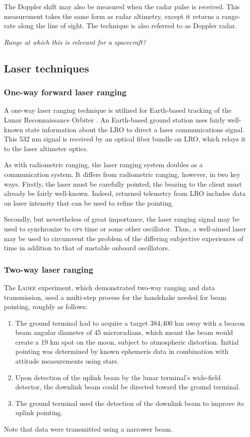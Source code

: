 \documentclass[12pt]{article}
\begin{document}
The Doppler shift may also be measured when the radar pulse is received. This measurement takes the same form as radar altimetry, except it returns a range-rate along the line of sight. The technique is also referred to as Doppler radar.

\textit{Range at which this is relevant for a spacecraft?}

\subsection{Laser techniques}

\subsubsection{One-way forward laser ranging}
A one-way laser ranging technique is utilized for Earth-based tracking of the Lunar Reconnaissance Orbiter \citep{Sun2013}. An Earth-based ground station uses fairly well-known state information about the LRO to direct a laser communications signal. This 532 nm signal is received by an optical fiber bundle on LRO, which relays it to the laser altimeter optics.

As with radiometric ranging, the laser ranging system doubles as a communication system. It differs from radiometric ranging, however, in two key ways. Firstly, the laser must be carefully pointed; the bearing to the client must already be fairly well-known. Indeed, returned telemetry from LRO includes data on laser intensity that can be used to refine the pointing.

Secondly, but nevertheless of great importance, the laser ranging signal may be used to synchronize to \textsc{gps} time or some other oscillator. Thus, a well-aimed laser may be used to circumvent the problem of the differing subjective experiences of time in addition to that of unstable onboard oscillators.


\subsubsection{Two-way laser ranging}
The \textsc{Ladee} experiment, which demonstrated two-way ranging and data transmission, used a multi-step process for the handshake needed for beam pointing, roughly as follows:
\begin{enumerate}
\item The ground terminal had to acquire a target 384,400 km away with a beacon beam angular diameter of 45 microradians, which meant the beam would create a 19 km spot on the moon, subject to atmospheric distortion. Initial pointing was determined by known ephemeris data in combination with attitude measurements using stars.
\item Upon detection of the uplink beam by the lunar terminal's wide-field detector, the downlink beam could be directed toward the ground terminal.
\item The ground terminal used the detection of the downlink beam to improve its uplink pointing.
\end{enumerate}
Note that data were transmitted using a narrower beam.
\end{document}
